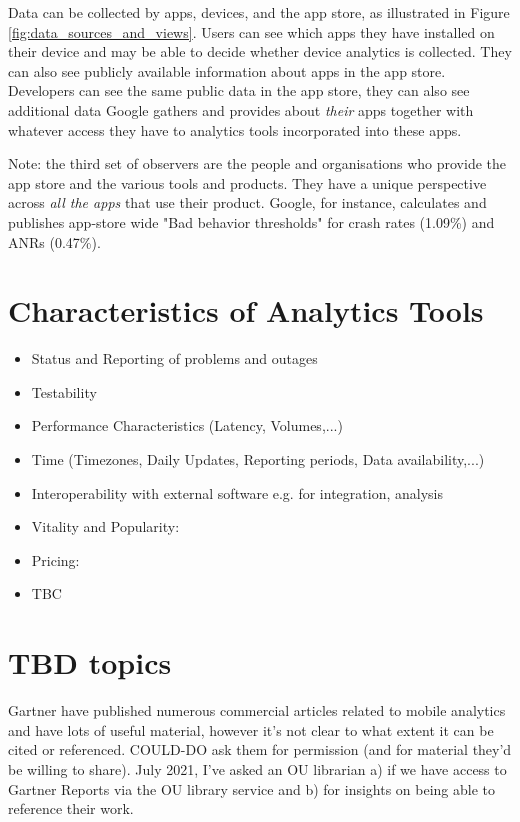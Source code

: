 Data can be collected by apps, devices, and the app store, as illustrated in Figure \ref{fig:data_sources_and_views}. Users can see which apps they have installed on their device and may be able to decide whether device analytics is collected. They can also see publicly available information about apps in the app store. Developers can see the same public data in the app store, they can also see additional data Google gathers and provides about \textit{their} apps together with whatever access they have to analytics tools incorporated into these apps.

Note: the third set of observers are the people and organisations who provide the app store and the various tools and products. They have a unique perspective across \textit{all the apps} that use their product. Google, for instance, calculates and publishes app-store wide "Bad behavior thresholds" for crash rates (1.09\%) and ANRs (0.47\%).

\section{Characteristics of Analytics Tools}


\begin{itemize}
    \item Status and Reporting of problems and outages
    \item Testability
    \item Performance Characteristics (Latency, Volumes,...)
    \item Time (Timezones, Daily Updates, Reporting periods, Data availability,...)
    \item Interoperability with external software e.g. for integration, analysis
    \item Vitality and Popularity: 
    \item Pricing:
    \item TBC
\end{itemize}


\section{TBD topics}
Gartner have published numerous commercial articles related to mobile analytics and have lots of useful material, however it's not clear to what extent it can be cited or referenced. COULD-DO ask them for permission (and for material they'd be willing to share).  July 2021, I've asked an OU librarian a) if we have access to Gartner Reports via the OU library service and b) for insights on being able to reference their work. 